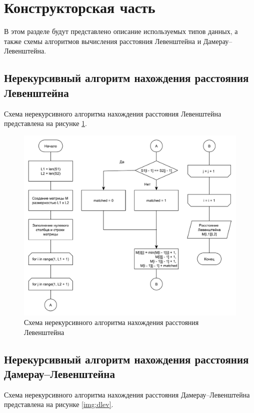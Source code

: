 \section{Конструкторская часть}

В этом разделе будут представлено описание используемых типов данных, а также схемы алгоритмов вычисления расстояния Левенштейна и Дамерау--Левенштейна.

\subsection{Нерекурсивный алгоритм нахождения расстояния Левенштейна}

Схема нерекурсивного алгоритма нахождения расстояния Левенштейна представлена на рисунке \ref{img:lev}.

\begin{figure}[h]
	\centering
	\includegraphics[scale=0.6]{images/lev.pdf}
	\caption{Схема нерекурсивного алгоритма нахождения расстояния Левенштейна}
	\label{img:lev}
\end{figure}

\newpage

\subsection{Нерекурсивный алгоритм нахождения расстояния Дамерау--Левенштейна}

Схема нерекурсивного алгоритма нахождения расстояния Дамерау--Левенштейна представлена на рисунке \ref{img:dlev}.

